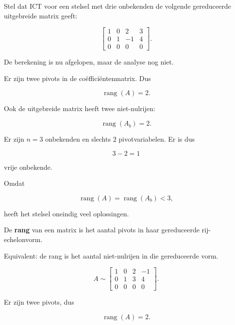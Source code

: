 \documentclass{ximera}
\begin{document}
\begin{voorbeeld}

Stel dat ICT voor een stelsel met drie onbekenden de volgende
gereduceerde uitgebreide matrix geeft:

\[
\left[
\begin{array}{ccc|c}
1&0&2&3\\
0&1&-1&4\\
0&0&0&0
\end{array}
\right].
\]

De berekening is nu afgelopen, maar de analyse nog niet.

Er zijn twee pivots in de coëfficiëntenmatrix. Dus

\[
\operatorname{rang}(A)=2.
\]

Ook de uitgebreide matrix heeft twee niet-nulrijen:

\[
\operatorname{rang}(A_b)=2.
\]

Er zijn \(n=3\) onbekenden en slechts \(2\) pivotvariabelen.
Er is dus

\[
3-2=1
\]

vrije onbekende.

Omdat

\[
\operatorname{rang}(A)=\operatorname{rang}(A_b)<3,
\]

heeft het stelsel oneindig veel oplossingen.
\end{voorbeeld}





\begin{definitie}
De \textbf{rang} van een matrix is het aantal pivots in haar
gereduceerde rij-echelonvorm.

Equivalent: de rang is het aantal niet-nulrijen in die gereduceerde vorm.
\end{definitie}


\begin{voorbeeld}

\[
A\sim
\begin{bmatrix}
1&0&2&-1\\
0&1&3&4\\
0&0&0&0
\end{bmatrix}.
\]

Er zijn twee pivots, dus

\[
\operatorname{rang}(A)=2.
\]

\end{voorbeeld}
\end{document}
